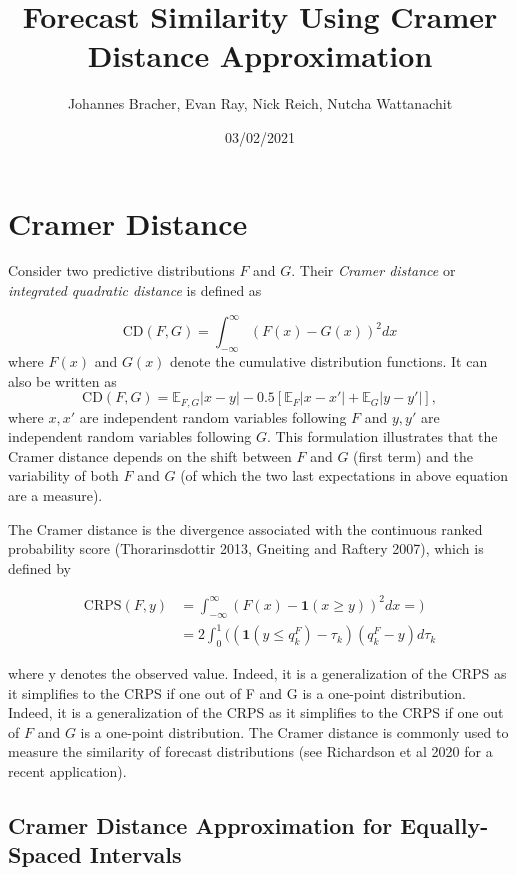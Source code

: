 \documentclass[
]{article}
\title{Forecast Similarity Using Cramer Distance Approximation}
\author{Johannes Bracher, Evan Ray, Nick Reich, Nutcha Wattanachit}
\date{03/02/2021}
\begin{document}
\maketitle

\hypertarget{cramer-distance}{%
\section{Cramer Distance}\label{cramer-distance}}

Consider two predictive distributions \(F\) and \(G\). Their
\emph{Cramer distance} or \emph{integrated quadratic distance} is
defined as

\[
\text{CD}(F, G) = \int_{-\infty}^\infty(F(x) - G(x))^2 dx
\] where \(F(x)\) and \(G(x)\) denote the cumulative distribution
functions. It can also be written as \begin{equation}
\text{CD}(F, G) = \mathbb{E}_{F, G}|x - y| - 0.5 \left[\mathbb{E}_F|x - x'| + \mathbb{E}_G|y - y'| \right], \label{eq:formulation_expectations}
\end{equation} where \(x, x'\) are independent random variables
following \(F\) and \(y, y'\) are independent random variables following
\(G\). This formulation illustrates that the Cramer distance depends on
the shift between \(F\) and \(G\) (first term) and the variability of
both \(F\) and \(G\) (of which the two last expectations in above
equation are a measure).

The Cramer distance is the divergence associated with the continuous
ranked probability score (Thorarinsdottir 2013, Gneiting and Raftery
2007), which is defined by

\begin{align}
\text{CRPS}(F, y) &= \int_{-\infty}^\infty(F(x) - \mathbf{1}(x \geq y))^2 dx = ) \\
&= 2\int_0^1((\mathbf{1}(y \leq q^F_k)-\tau_k)(q^F_k-y) d\tau_k \label{eq:crps}
\end{align}

where y denotes the observed value. Indeed, it is a generalization of
the CRPS as it simplifies to the CRPS if one out of F and G is a
one-point distribution. Indeed, it is a generalization of the CRPS as it
simplifies to the CRPS if one out of \(F\) and \(G\) is a one-point
distribution. The Cramer distance is commonly used to measure the
similarity of forecast distributions (see Richardson et al 2020 for a
recent application).

\hypertarget{cramer-distance-approximation-for-equally-spaced-intervals}{%
\subsection{Cramer Distance Approximation for Equally-Spaced
Intervals}\label{cramer-distance-approximation-for-equally-spaced-intervals}}
\end{document}
